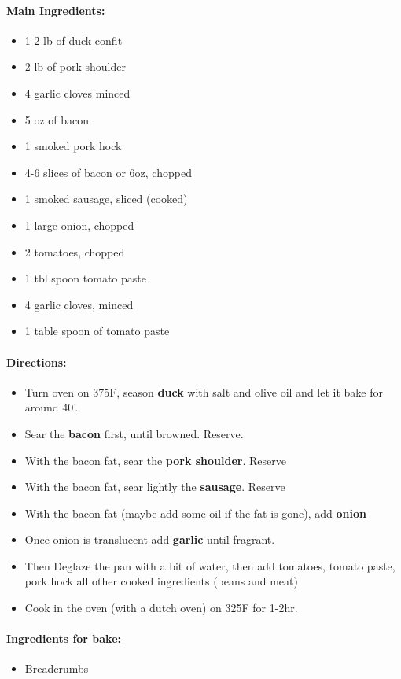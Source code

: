 \documentclass{article}
\begin{document}
\paragraph{Main Ingredients:}
\begin{itemize}
	\item 1-2 lb of duck confit	
	\item 2 lb of pork shoulder
	\item 4 garlic cloves minced
	\item 5 oz of bacon
	\item 1 smoked pork hock
	\item 4-6 slices of bacon or 6oz, chopped
	\item 1 smoked sausage, sliced (cooked)
	\item 1 large onion, chopped
	\item 2 tomatoes, chopped
	\item 1 tbl spoon tomato paste
	\item 4 garlic cloves, minced
	\item 1 table spoon of tomato paste
\end{itemize}

\paragraph{Directions:}
\begin{itemize}
	\item Turn oven on 375F, season \textbf{duck} with salt and olive oil and let it bake for around 40'.
	\item Sear the \textbf{bacon} first, until browned. Reserve.
	\item With the bacon fat, sear the \textbf{pork shoulder}. Reserve
	\item With the bacon fat, sear lightly the \textbf{sausage}. Reserve
	\item With the bacon fat (maybe add some oil if the fat is gone), add \textbf{onion}
	\item Once onion is translucent add \textbf{garlic} until fragrant.
	\item Then Deglaze the pan with a bit of water, then add tomatoes, tomato paste, pork hock all other cooked ingredients (beans and meat)
	\item Cook in the oven (with a dutch oven) on 325F for 1-2hr.
\end{itemize}

\paragraph{Ingredients for bake:}
\begin{itemize}
	\item Breadcrumbs
\end{itemize}
\end{document}
